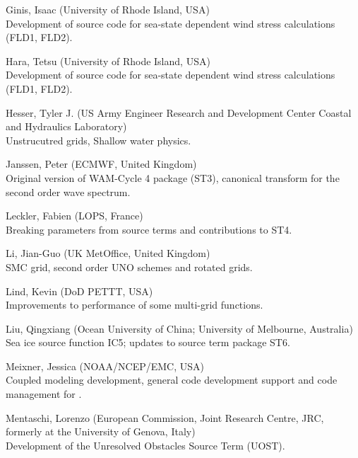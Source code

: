 \begin{list}{\ldots}{ }
\item [Ginis, Isaac] (University of Rhode Island, USA) \\
  Development of source code for sea-state dependent wind stress calculations (FLD1, FLD2).

\item [Hara, Tetsu] (University of Rhode Island, USA) \\
  Development of source code for sea-state dependent wind stress calculations (FLD1, FLD2).

\item [Hesser, Tyler J.] (US Army Engineer Research and Development Center Coastal and Hydraulics Laboratory) \\
 Unstrucutred grids, Shallow water physics.

\item [Janssen, Peter] (ECMWF, United Kingdom) \\
  Original version of WAM-Cycle 4 package (ST3), canonical transform for the second order wave spectrum.

\item [Leckler, Fabien] (LOPS, France) \\
  Breaking parameters from source terms and contributions to ST4.

\item [Li, Jian-Guo] (UK MetOffice, United Kingdom) \\
  SMC grid, second order UNO schemes and rotated grids.

\item [Lind, Kevin]  (DoD PETTT, USA)\\ 
  Improvements to performance of some multi-grid functions.
 
\item [Liu, Qingxiang] (Ocean University of China; University of Melbourne, Australia)\\
  Sea ice source function IC5; updates to source term package ST6.

\item [Meixner, Jessica] (NOAA/NCEP/EMC, USA) \\
  Coupled modeling development, general code development support and code management for \ws.
 
\item [Mentaschi, Lorenzo]  (European Commission, Joint Research Centre, JRC,
  formerly at the University of Genova, Italy)\\ 
  Development of the Unresolved Obstacles Source Term (UOST).
 

\end{list}
